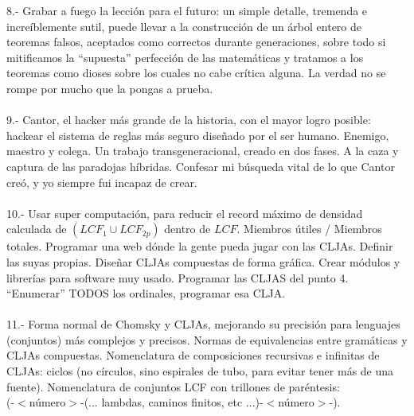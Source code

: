 8.- Grabar a fuego la lección para el futuro: un simple detalle, tremenda e increíblemente sutil, puede llevar a la construcción de un árbol entero de teoremas falsos, aceptados como correctos durante generaciones, sobre todo si mitificamos la ``supuesta'' perfección de las matemáticas y tratamos a los teoremas como dioses sobre los cuales no cabe crítica alguna. La verdad no se rompe por mucho que la pongas a prueba.\\\\
9.- Cantor, el hacker más grande de la historia, con el mayor logro posible: hackear el sistema de reglas más seguro diseñado por el ser humano. Enemigo, maestro y colega. Un trabajo transgeneracional, creado en dos fases. A la caza y captura de las paradojas híbridas. Confesar mi búsqueda vital de lo que Cantor creó, y yo siempre fui incapaz de crear.\\\\
10.- Usar super computación, para reducir el record máximo de densidad calculada de $(LCF_{1} \cup LCF_{2p})$ dentro de $LCF$. Miembros útiles / Miembros totales. Programar una web dónde la gente pueda jugar con las CLJAs. Definir las suyas propias. Diseñar CLJAs compuestas de forma gráfica. Crear módulos y librerías para software muy usado. Programar las CLJAS del punto 4. ``Enumerar'' TODOS los ordinales, programar esa CLJA.\\\\
11.- Forma normal de Chomsky y CLJAs, mejorando su precisión para lenguajes (conjuntos) más complejos y precisos. Normas de equivalencias entre gramáticas y CLJAs compuestas. Nomenclatura de composiciones recursivas e infinitas de CLJAs: ciclos (no círculos, sino espirales de tubo, para evitar tener más de una fuente). Nomenclatura de conjuntos LCF con trillones de paréntesis:\\
(-$<$número$>$-(... lambdas, caminos finitos, etc ...)-$<$número$>$-).




